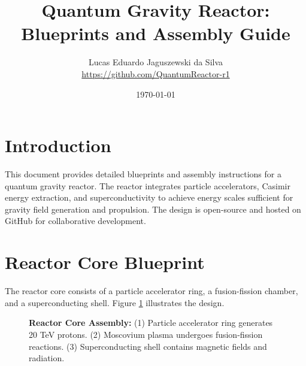 \documentclass[12pt, a4paper]{article}
\title{Quantum Gravity Reactor: Blueprints and Assembly Guide}
\author{Lucas Eduardo Jaguszewski da Silva \\ \url{https://github.com/QuantumReactor-r1}}
\date{\today}
\begin{document}
\maketitle

\section{Introduction}
This document provides detailed blueprints and assembly instructions for a quantum gravity reactor. The reactor integrates particle accelerators, Casimir energy extraction, and superconductivity to achieve energy scales sufficient for gravity field generation and propulsion. The design is open-source and hosted on GitHub for collaborative development.

\section{Reactor Core Blueprint}
The reactor core consists of a particle accelerator ring, a fusion-fission chamber, and a superconducting shell. Figure \ref{fig:reactor_core} illustrates the design.

\begin{figure}[H]
\centering
{}
\caption{
\textbf{Reactor Core Assembly:} 
(1) Particle accelerator ring generates 20 TeV protons. 
(2) Moscovium plasma undergoes fusion-fission reactions. 
(3) Superconducting shell contains magnetic fields and radiation.
}
\label{fig:reactor_core}
\end{figure}
\end{document}
